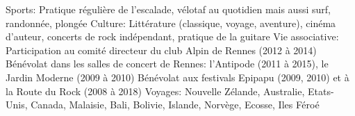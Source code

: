 \begin{cvskills}
  \cvskill
    {Sports:}
	{Pratique régulière de l'escalade, vélotaf au quotidien mais aussi surf,
	 randonnée, plongée}
  \cvskill
    {Culture:}
	{
        Littérature (classique, voyage, aventure), cinéma d'auteur, concerts de
        rock indépendant, pratique de la guitare
	}
  \cvskill
    {Vie associative:}
	{
		Participation au comité directeur du club Alpin de Rennes (2012 à 2014)
		\newline
		Bénévolat dans les salles de concert de Rennes: l'Antipode (2011 à 2015),
		le Jardin Moderne (2009 à 2010) \newline
        Bénévolat aux festivals Epipapu (2009, 2010) et à la Route du Rock
        (2008 à 2018)}
  \cvskill
    {Voyages:}
    {Nouvelle Zélande, Australie, Etats-Unis, Canada, Malaisie, Bali, Bolivie,
    Islande, Norvège, Ecosse, Iles Féroé}
\end{cvskills}
